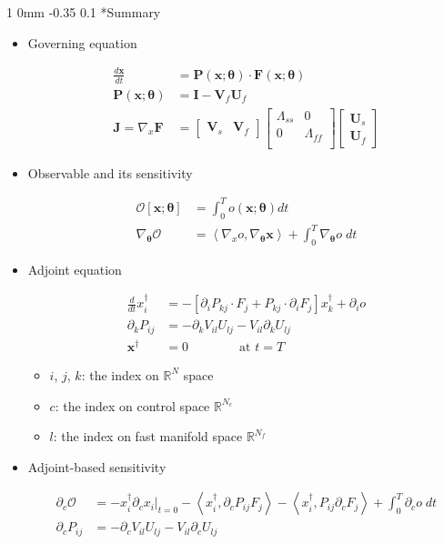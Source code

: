 \documentclass[11pt]{article}
\makeatletter
\renewcommand{\subsection}{\@startsection
{subsection}%
{1}%
{0mm}%
{-0.35\baselineskip}%
{0.1\baselineskip}%
{\normalfont\large\bfseries\color{brown}}}%
\def\Dnorm#1#2{ \frac{d #1 }{ d #2} }
\newcommand\eqsp[2]{
\begin{equation#1}
\begin{split}
#2
\end{split}
\end{equation#1}
}
\newcommand{\cO}{\mathcal{O}}
\newcommand{\bx}{\mathbf{x}}
\newcommand{\bt}{\mathbf{\theta}}
\newcommand{\bI}{\mathbf{I}}
\newcommand{\bP}{\mathbf{P}}
\newcommand{\bF}{\mathbf{F}}
\newcommand{\bV}{\mathbf{V}}
\newcommand{\bU}{\mathbf{U}}
\newcommand{\bJ}{\mathbf{J}}
\newcommand{\inprod}[2]{\left\langle #1,#2 \right\rangle}
\makeatother
\begin{document}
\subsection*{Summary}
\begin{itemize}
\item Governing equation
\eqsp{}{
\Dnorm{\bx}{t} &= \bP(\bx;\bt)\cdot\bF(\bx;\bt)\\
\bP(\bx;\bt) &= \bI - \bV_f\bU_f\\
\bJ = \nabla_x\bF &= 
\begin{bmatrix}
\bV_s & \bV_f
\end{bmatrix}
\begin{bmatrix}
\Lambda_{ss} & 0 \\
0 & \Lambda_{ff} \\
\end{bmatrix}
\begin{bmatrix}
\bU_s \\
\bU_f
\end{bmatrix}
\label{g}
}
\item Observable and its sensitivity
\eqsp{}{
\cO[\bx;\bt] &= \int_0^T o(\bx;\bt) dt\\
\nabla_{\bt}\cO &= \inprod{\nabla_xo}{\nabla_{\bt}\bx} + \int_0^T \nabla_{\bt}o\;dt
\label{o}
}
\item Adjoint equation
\eqsp{}{
\Dnorm{}{t}x_i^{\dagger} &= - \left[ \partial_iP_{kj}\cdot F_j + P_{kj}\cdot\partial_iF_j \right]x_k^{\dagger} + \partial_io\\
\partial_kP_{ij} &= -\partial_kV_{il}U_{lj} - V_{il}\partial_kU_{lj}\\
\bx^{\dagger} &= 0\qquad\qquad \text{at }t=T
\label{adj}
}
\begin{itemize}
\item $i$, $j$, $k$: the index on $\mathbb{R}^N$ space
\item $c$: the index on control space $\mathbb{R}^{N_c}$
\item $l$: the index on fast manifold space $\mathbb{R}^{N_f}$
\end{itemize}
\item Adjoint-based sensitivity
\eqsp{}{
\partial_c\cO &= - x_i^{\dagger}\partial_cx_i\bigg|_{t=0}
- \inprod{x_i^{\dagger}}{\partial_cP_{ij}F_j}
- \inprod{x_i^{\dagger}}{P_{ij}\partial_cF_j}
+ \int_0^T \partial_co\;dt\\
\partial_cP_{ij} &= -\partial_cV_{il}U_{lj} - V_{il}\partial_cU_{lj}
\label{adj_grad}
}
\end{itemize}
\end{document}
